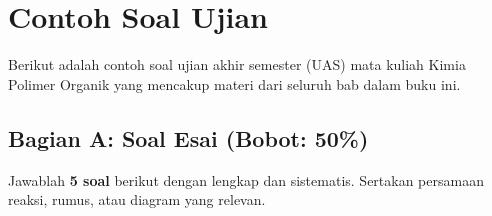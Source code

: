 \documentclass[12pt,a4paper,openany]{book}
\begin{document}
\chapter{Contoh Soal Ujian}

Berikut adalah contoh soal ujian akhir semester (UAS) mata kuliah Kimia Polimer Organik yang mencakup materi dari seluruh bab dalam buku ini.

\section*{Bagian A: Soal Esai (Bobot: 50\%)}

Jawablah \textbf{5 soal} berikut dengan lengkap dan sistematis. Sertakan persamaan reaksi, rumus, atau diagram yang relevan.
\end{document}
